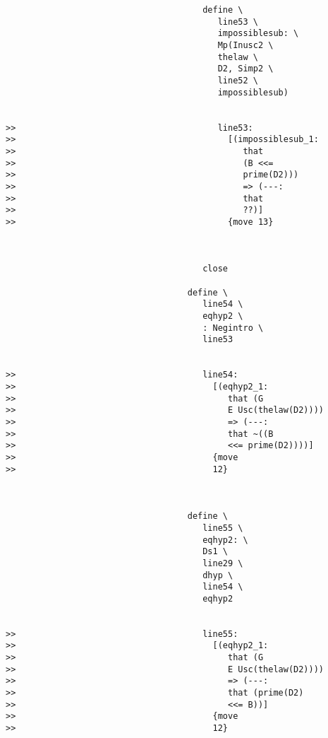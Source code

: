 \documentclass[12pt]{article}
\begin{document}
\begin{verbatim}
                                       define \
                                          line53 \
                                          impossiblesub: \
                                          Mp(Inusc2 \
                                          thelaw \
                                          D2, Simp2 \
                                          line52 \
                                          impossiblesub)


>>                                        line53:
>>                                          [(impossiblesub_1:
>>                                             that
>>                                             (B <<=
>>                                             prime(D2)))
>>                                             => (---:
>>                                             that
>>                                             ??)]
>>                                          {move 13}



                                       close

                                    define \
                                       line54 \
                                       eqhyp2 \
                                       : Negintro \
                                       line53


>>                                     line54:
>>                                       [(eqhyp2_1:
>>                                          that (G
>>                                          E Usc(thelaw(D2))))
>>                                          => (---:
>>                                          that ~((B
>>                                          <<= prime(D2))))]
>>                                       {move
>>                                       12}



                                    define \
                                       line55 \
                                       eqhyp2: \
                                       Ds1 \
                                       line29 \
                                       dhyp \
                                       line54 \
                                       eqhyp2


>>                                     line55:
>>                                       [(eqhyp2_1:
>>                                          that (G
>>                                          E Usc(thelaw(D2))))
>>                                          => (---:
>>                                          that (prime(D2)
>>                                          <<= B))]
>>                                       {move
>>                                       12}




\end{verbatim}
\end{document}
